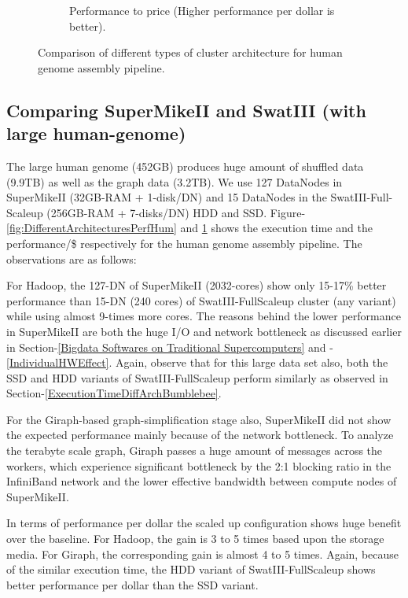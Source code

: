 \documentclass[conference]{IEEEtran}
\begin{document}
\begin{figure}[htb]
\begin{subfigure}[b]{0.23\textwidth}
                \caption{Performance to price (Higher performance per dollar is better).}
                \label{fig:DifferentArchitecturesPerfPerDollarHum}
        \end{subfigure}
        \caption{Comparison of different types of cluster architecture for human genome assembly pipeline.}
  \label{fig:DifferentArchitecturesHum}
  \vspace{-.8em}
\end{figure}
\subsection {Comparing SuperMikeII and SwatIII (with large human-genome)} \label{SecPerfDiffArchHum}
The large human genome (452GB)  produces huge amount of shuffled data (9.9TB) as well as the graph data (3.2TB). We use 127 DataNodes in SuperMikeII (32GB-RAM + 1-disk/DN) and 15 DataNodes in the SwatIII-Full-Scaleup (256GB-RAM + 7-disks/DN) HDD and SSD. Figure-\ref{fig:DifferentArchitecturesPerfHum} and \ref{fig:DifferentArchitecturesPerfPerDollarHum} shows the execution time and the performance/\$ respectively for the human genome assembly pipeline. The observations are as follows:
\begin{inparaenum}[\itshape 1\upshape)]
\item For Hadoop, the 127-DN of SuperMikeII (2032-cores) show only 15-17\% better performance than 15-DN (240 cores) of SwatIII-FullScaleup cluster (any variant) while using almost 9-times more cores. The reasons behind the lower performance in SuperMikeII are both the huge I/O and network bottleneck as discussed earlier in Section-\ref{Bigdata Softwares on Traditional Supercomputers} and -\ref{IndividualHWEffect}. Again, observe that for this large data set also, both the SSD and HDD variants of SwatIII-FullScaleup perform similarly as observed in Section-\ref{ExecutionTimeDiffArchBumblebee}.
\item For the Giraph-based graph-simplification stage also, SuperMikeII did not show the expected performance mainly because of the network bottleneck. To analyze the terabyte scale graph, Giraph passes a huge amount of messages across the workers, which experience significant bottleneck by the 2:1 blocking ratio in the InfiniBand network and the lower effective bandwidth between compute nodes of SuperMikeII.  
\item In terms of performance per dollar the scaled up configuration shows huge benefit over the baseline. For Hadoop, the gain is 3 to 5 times based upon the storage media. For Giraph, the corresponding gain is almost 4 to 5 times.  Again, because of the similar execution time, the HDD variant of SwatIII-FullScaleup shows better performance per dollar than the SSD variant.
\end{inparaenum}
\end{document}
